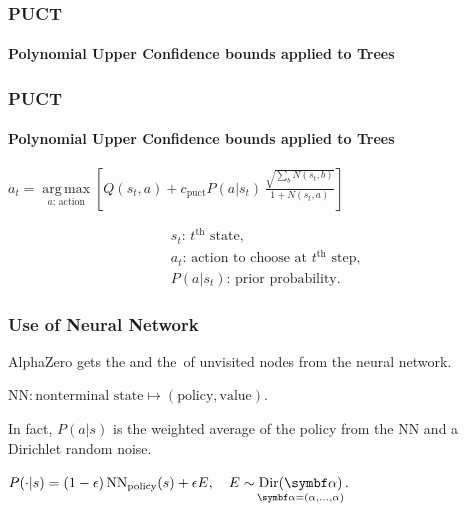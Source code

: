 \begin{frame}[fragile]
  \frametitle{PUCT}
  \framesubtitle{Polynomial Upper Confidence bounds applied to Trees}

  \begin{center}
\end{center}
\end{frame}

\begin{frame}[fragile]
  \frametitle{PUCT}
  \framesubtitle{Polynomial Upper Confidence bounds applied to Trees}

  \begin{center}
  {\large $\displaystyle a_t = \mathop{\operatorname{arg\,max}}\limits_{a\text{: action}} \left[ Q(s_t, a) + c_{\text{puct}} P(a|s_t) \, \frac{\sqrt{\sum_{b} N(s_t, b)}}{1 + N(s_t, a)} \right] $}

  \begin{align*}
    &\text{$s_t$: $t^\text{th}$ state,}\\
    &\text{$a_t$: action to choose at $t^\text{th}$ step,}\\
    &\text{$P(a|s_t)$: prior probability.}
  \end{align*}
\end{center}
\end{frame}

\begin{frame}[fragile]
  \frametitle{Use of Neural Network}

  AlphaZero gets the  and the  \!\,of unvisited nodes from the neural network.

  \vspace{1em}

  \begin{center}
    \Large $\text{NN}\colon \text{nonterminal state}\mapsto (\text{policy}, \text{value}).$
  \end{center}

  \vspace{1em}

  In fact, $P(a|s)$ is the weighted average of the policy from the NN and a Dirichlet random noise.

  \vspace{1em}

  \begin{center}
    \large $P(\cdot|s) = (1-\epsilon)\,\text{NN}_{\text{policy}}(s) + \epsilon E,\quad E\sim \mathop{\mathrm{Dir}(\symbf\alpha)}\limits_{\mathclap{\symbf\alpha = (\alpha,\dots,\alpha)}}.$
  \end{center}
\end{frame}

